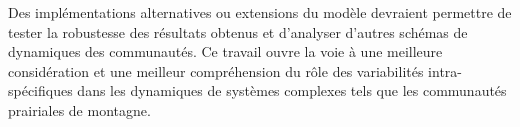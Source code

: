 \documentclass[a4paper, notoc, justified,marginals=left, nobib]{tufte-book}
\newcommand{\model}{\textit{\texttt{MountGrass}}}
\begin{document}
\begin{fullwidth}
Des implémentations alternatives ou extensions du modèle devraient permettre de tester la robustesse des résultats obtenus et d'analyser d'autres schémas de dynamiques des communautés. Ce travail ouvre la voie à une meilleure considération et une meilleur compréhension du rôle des variabilités intra-spécifiques dans les dynamiques de systèmes complexes tels que les communautés prairiales de montagne.




\end{fullwidth}
\end{document}

